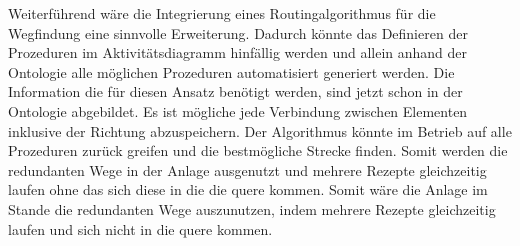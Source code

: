 Weiterführend wäre die Integrierung eines Routingalgorithmus für die Wegfindung eine sinnvolle Erweiterung. Dadurch könnte das Definieren der Prozeduren im Aktivitätsdiagramm hinfällig werden und allein anhand der Ontologie alle möglichen Prozeduren automatisiert generiert werden. Die Information die für diesen Ansatz benötigt werden, sind jetzt schon in der Ontologie abgebildet. Es ist mögliche jede Verbindung zwischen Elementen inklusive der Richtung abzuspeichern. Der Algorithmus könnte im Betrieb auf alle Prozeduren zurück greifen und die bestmögliche Strecke finden. Somit werden die redundanten Wege in der Anlage ausgenutzt und mehrere Rezepte gleichzeitig laufen ohne das sich diese in die die quere kommen.
Somit wäre die Anlage im Stande die redundanten Wege auszunutzen, indem mehrere Rezepte gleichzeitig laufen und sich nicht in die quere kommen.

